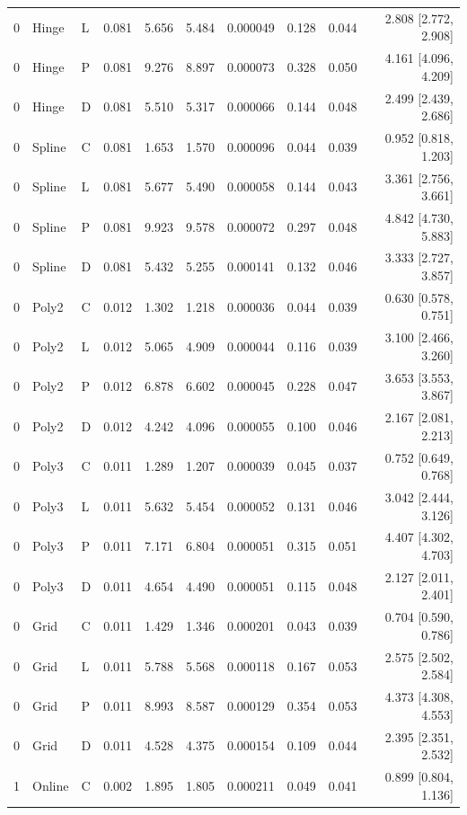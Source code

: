 \begin{longtable}{lllrrrrrrr}
0 & Hinge & L & 0.081 & 5.656 & 5.484 & 0.000049 & 0.128 & 0.044 & 2.808 [2.772, 2.908] \\
0 & Hinge & P & 0.081 & 9.276 & 8.897 & 0.000073 & 0.328 & 0.050 & 4.161 [4.096, 4.209] \\
0 & Hinge & D & 0.081 & 5.510 & 5.317 & 0.000066 & 0.144 & 0.048 & 2.499 [2.439, 2.686] \\
0 & Spline & C & 0.081 & 1.653 & 1.570 & 0.000096 & 0.044 & 0.039 & 0.952 [0.818, 1.203] \\
0 & Spline & L & 0.081 & 5.677 & 5.490 & 0.000058 & 0.144 & 0.043 & 3.361 [2.756, 3.661] \\
0 & Spline & P & 0.081 & 9.923 & 9.578 & 0.000072 & 0.297 & 0.048 & 4.842 [4.730, 5.883] \\
0 & Spline & D & 0.081 & 5.432 & 5.255 & 0.000141 & 0.132 & 0.046 & 3.333 [2.727, 3.857] \\
0 & Poly2 & C & 0.012 & 1.302 & 1.218 & 0.000036 & 0.044 & 0.039 & 0.630 [0.578, 0.751] \\
0 & Poly2 & L & 0.012 & 5.065 & 4.909 & 0.000044 & 0.116 & 0.039 & 3.100 [2.466, 3.260] \\
0 & Poly2 & P & 0.012 & 6.878 & 6.602 & 0.000045 & 0.228 & 0.047 & 3.653 [3.553, 3.867] \\
0 & Poly2 & D & 0.012 & 4.242 & 4.096 & 0.000055 & 0.100 & 0.046 & 2.167 [2.081, 2.213] \\
0 & Poly3 & C & 0.011 & 1.289 & 1.207 & 0.000039 & 0.045 & 0.037 & 0.752 [0.649, 0.768] \\
0 & Poly3 & L & 0.011 & 5.632 & 5.454 & 0.000052 & 0.131 & 0.046 & 3.042 [2.444, 3.126] \\
0 & Poly3 & P & 0.011 & 7.171 & 6.804 & 0.000051 & 0.315 & 0.051 & 4.407 [4.302, 4.703] \\
0 & Poly3 & D & 0.011 & 4.654 & 4.490 & 0.000051 & 0.115 & 0.048 & 2.127 [2.011, 2.401] \\
0 & Grid & C & 0.011 & 1.429 & 1.346 & 0.000201 & 0.043 & 0.039 & 0.704 [0.590, 0.786] \\
0 & Grid & L & 0.011 & 5.788 & 5.568 & 0.000118 & 0.167 & 0.053 & 2.575 [2.502, 2.584] \\
0 & Grid & P & 0.011 & 8.993 & 8.587 & 0.000129 & 0.354 & 0.053 & 4.373 [4.308, 4.553] \\
0 & Grid & D & 0.011 & 4.528 & 4.375 & 0.000154 & 0.109 & 0.044 & 2.395 [2.351, 2.532] \\
1 & Online & C & 0.002 & 1.895 & 1.805 & 0.000211 & 0.049 & 0.041 & 0.899 [0.804, 1.136] \\

\end{longtable}
